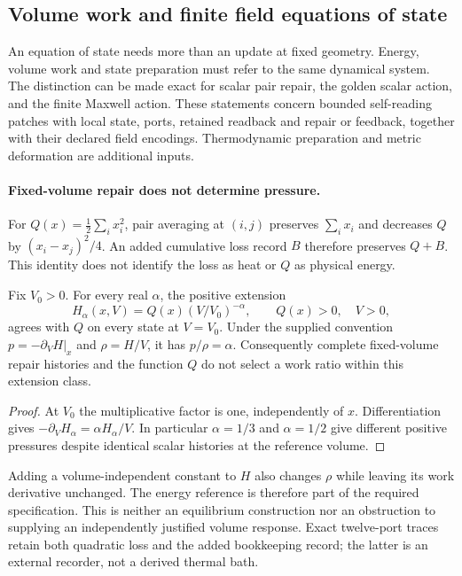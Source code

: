 \subsection{Volume work and finite field equations of state}
\label{sec:finite-field-equation-of-state}

An equation of state needs more than an update at fixed geometry. Energy,
volume work and state preparation must refer to the same dynamical system.
The distinction can be made exact for scalar pair repair, the golden scalar
action, and the finite Maxwell action. These statements concern bounded
self-reading patches with local state, ports, retained readback and repair
or feedback, together with their declared field encodings. Thermodynamic
preparation and metric deformation are additional inputs.

\paragraph{Fixed-volume repair does not determine pressure.}
For $Q(x)=\frac12\sum_i x_i^2$, pair averaging at $(i,j)$ preserves
$\sum_i x_i$ and decreases $Q$ by $(x_i-x_j)^2/4$. An added cumulative
loss record $B$ therefore preserves $Q+B$. This identity does not identify
the loss as heat or $Q$ as physical energy.

\begin{proposition}
\label{prop:finite-eos-work-ambiguity}
Fix $V_0>0$. For every real $\alpha$, the positive extension
\[
 H_\alpha(x,V)=Q(x)(V/V_0)^{-\alpha},\qquad Q(x)>0,\quad V>0,
\]
agrees with $Q$ on every state at $V=V_0$. Under the supplied convention
$p=-\partial_VH|_x$ and $\rho=H/V$, it has $p/\rho=\alpha$.
Consequently complete fixed-volume repair histories and the function $Q$
do not select a work ratio within this extension class.
\end{proposition}
\begin{proof}
At $V_0$ the multiplicative factor is one, independently of $x$.
Differentiation gives $-\partial_VH_\alpha=\alpha H_\alpha/V$.
In particular $\alpha=1/3$ and $\alpha=1/2$ give different positive
pressures despite identical scalar histories at the reference volume.
\end{proof}
Adding a volume-independent constant to $H$ also changes $\rho$ while
leaving its work derivative unchanged. The energy reference is therefore
part of the required specification. This is neither an equilibrium
construction nor an obstruction to supplying an independently justified
volume response. Exact twelve-port traces retain both quadratic loss and
the added bookkeeping record; the latter is an external recorder, not a
derived thermal bath.

